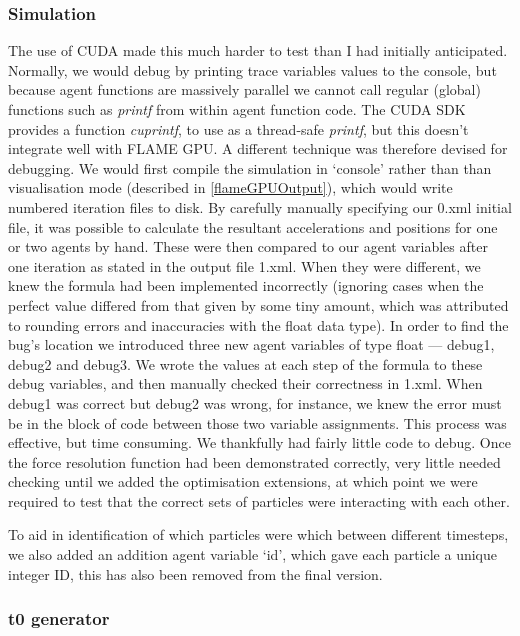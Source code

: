\documentclass[11pt,a4paper]{article}
\begin{document}
\subsubsection{Simulation}
\label{simulationTesting}
The use of CUDA made this much harder to test than I had initially anticipated. Normally, we would debug by printing trace variables values to the console, but because agent functions are massively parallel we cannot call regular (global) functions such as \emph{printf} from within agent function code. The CUDA SDK provides a function \emph{cuprintf}, to use as a thread-safe \emph{printf}, but this doesn't integrate well with FLAME GPU. A different technique was therefore devised for debugging. We would first compile the simulation in `console' rather than than visualisation mode (described in \ref{flameGPUOutput}), which would write numbered iteration files to disk. By carefully manually specifying our 0.xml initial file, it was possible to calculate the resultant accelerations and positions for one or two agents by hand. These were then compared to our agent variables after one iteration as stated in the output file 1.xml. When they were different, we knew the formula had been implemented incorrectly (ignoring cases when the perfect value differed from that given by some tiny amount, which was attributed to rounding errors and inaccuracies with the float data type). In order to find the bug's location we introduced three new agent variables of type float --- debug1, debug2 and debug3. We wrote the values at each step of the formula to these debug variables, and then manually checked their correctness in 1.xml. When debug1 was correct but debug2 was wrong, for instance, we knew the error must be in the block of code between those two variable assignments. This process was effective, but time consuming. We thankfully had fairly little code to debug. Once the force resolution function had been demonstrated correctly, very little needed checking until we added the optimisation extensions, at which point we were required to test that the correct sets of particles were interacting with each other.

To aid in identification of which particles were which between different timesteps, we also added an addition agent variable `id', which gave each particle a unique integer ID, this has also been removed from the final version.

\subsubsection{t0 generator}
\end{document}
